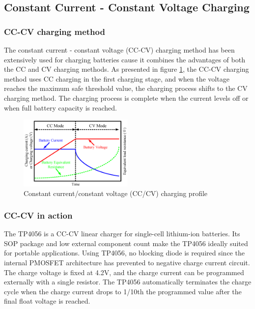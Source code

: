 \documentclass[\main/main.tex]{subfiles}
\begin{document}
\subsection{Constant Current - Constant Voltage Charging}

\subsubsection{CC-CV charging method}
The constant current - constant voltage (CC-CV) charging method has been extensively used for charging batteries cause it combines the advantages of both the CC and CV charging methods. As presented in figure \ref{fig:tp4056_cc_cv_profile}, the CC-CV charging method uses CC charging in the first charging stage, and when the voltage reaches the maximum safe threshold value, the charging process shifts to the CV charging method. The charging process is complete when the current levels off or when full battery capacity is reached.

\begin{figure}[H]
    \begin{center}
        \includegraphics[width=0.5\textwidth]{tp4056_cc_cv_profile.png}
    \end{center}
    \caption{Constant current/constant voltage (CC/CV) charging profile}
    \label{fig:tp4056_cc_cv_profile}
\end{figure}

\subsubsection{CC-CV in action}
The TP4056 is a CC-CV linear charger for single-cell lithium-ion batteries. Its SOP package and low external component count make the TP4056 ideally suited for portable applications. Using TP4056, no blocking diode is required since the internal PMOSFET architecture has prevented to negative charge current circuit. The charge voltage is
fixed at 4.2V, and the charge current can be programmed externally with a single resistor. The TP4056 automatically terminates the charge cycle when the charge current drops to 1/10th the programmed value after the final float voltage is reached. 
\end{document}
